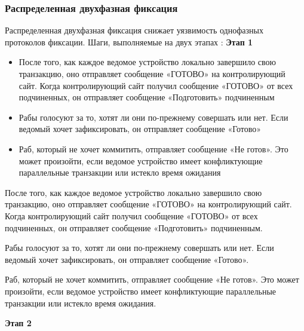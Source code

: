 \bigbreak

\subsubsection{Распределенная двухфазная фиксация}

Распределенная двухфазная фиксация снижает уязвимость однофазных протоколов фиксации. Шаги, выполняемые на двух этапах \autocite{FixProtocols}:
\bigbreak
\textbf{Этап 1}
\begin{itemize}
    \item После того, как каждое ведомое устройство локально завершило свою транзакцию,
    оно отправляет сообщение «ГОТОВО» на контролирующий сайт. Когда контролирующий сайт получил сообщение «ГОТОВО»
    от всех подчиненных, он отправляет сообщение «Подготовить» подчиненным
    \item Рабы голосуют за то, хотят ли они по-прежнему совершать или нет. Если ведомый
    хочет зафиксировать, он отправляет сообщение «Готово»
    \item Раб, который не хочет коммитить, отправляет сообщение «Не готов». Это может произойти,
    если ведомое устройство имеет конфликтующие параллельные транзакции или истекло время ожидания
\end{itemize}

После того, как каждое ведомое устройство локально завершило свою транзакцию, оно отправляет
сообщение «ГОТОВО» на контролирующий сайт. Когда контролирующий сайт получил сообщение «ГОТОВО» от всех подчиненных,
он отправляет сообщение «Подготовить» подчиненным.

Рабы голосуют за то, хотят ли они по-прежнему совершать или нет. Если ведомый хочет зафиксировать,
он отправляет сообщение «Готово».

Раб, который не хочет коммитить, отправляет сообщение «Не готов». Это может произойти, если ведомое
устройство имеет конфликтующие параллельные транзакции или истекло время ожидания.

\textbf{Этап 2}

